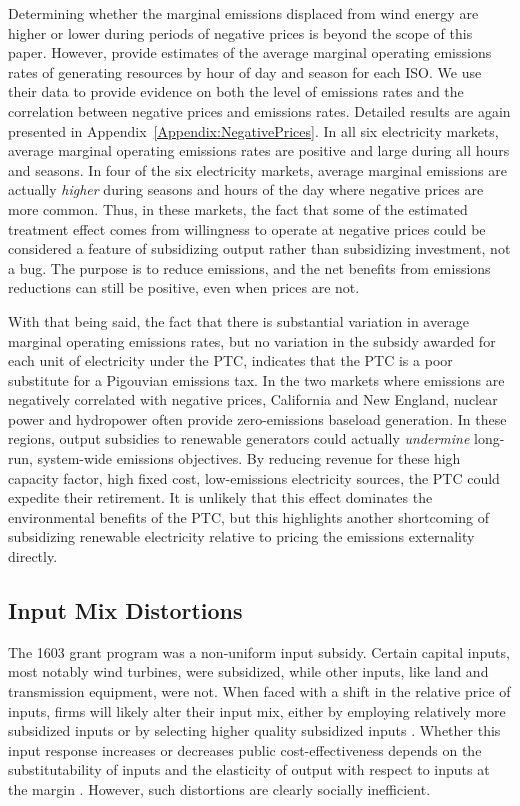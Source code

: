 \documentclass[12pt]{article}
\begin{document}
Determining whether the marginal emissions displaced from wind energy are higher or lower during periods of negative prices is beyond the scope of this paper. However, \citet{callaway_location_2018} provide estimates of the average marginal operating emissions rates of generating resources by hour of day and season for each ISO. We use their data to provide evidence on both the level of emissions rates and the correlation between negative prices and emissions rates. Detailed results are again presented in Appendix~\ref{Appendix:NegativePrices}. In all six electricity markets, average marginal operating emissions rates are positive and large during all hours and seasons. In four of the six electricity markets, average marginal emissions are actually \emph{higher} during seasons and hours of the day where negative prices are more common. Thus, in these markets, the fact that some of the estimated treatment effect comes from willingness to operate at negative prices could be considered a feature of subsidizing output rather than subsidizing investment, not a bug. The purpose is to reduce emissions, and the net benefits from emissions reductions can still be positive, even when prices are not.

With that being said, the fact that there is substantial variation in average marginal operating emissions rates, but no variation in the subsidy awarded for each unit of electricity under the PTC, indicates that the PTC is a poor substitute for a Pigouvian emissions tax. In the two markets where emissions are negatively correlated with negative prices, California and New England, nuclear power and hydropower often provide zero-emissions baseload generation. In these regions, output subsidies to renewable generators could actually \emph{undermine} long-run, system-wide emissions objectives. By reducing revenue for these high capacity factor, high fixed cost, low-emissions electricity sources, the PTC could expedite their retirement. It is unlikely that this effect dominates the environmental benefits of the PTC, but this highlights another shortcoming of subsidizing renewable electricity relative to pricing the emissions externality directly.

\subsection{Input Mix Distortions}

The 1603 grant program was a non-uniform input subsidy. Certain capital inputs, most notably wind turbines, were subsidized, while other inputs, like land and transmission equipment, were not. When faced with a shift in the relative price of inputs, firms will likely alter their input mix, either by employing relatively more subsidized inputs or by selecting higher quality subsidized inputs \citep[as found for other industries in][]{goolsbee_taxes_2004}. Whether this input response increases or decreases public cost-effectiveness depends on the substitutability of inputs and the elasticity of output with respect to inputs at the margin \citep{parish_relative_1982}. However, such distortions are clearly socially inefficient. 
\end{document}
